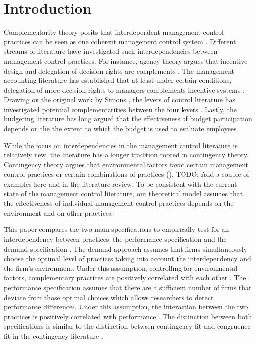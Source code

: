 \documentclass[12pt]{article}
\begin{document}
\section{Introduction}\label{introduction}

 Complementarity theory posits that interdependent management control practices can be seen as one coherent management control system \citep{Milgrom1995, Grabner2013}. Different streams of literature have investigated such interdependencies between management control practices. For instance, agency theory argues that incentive design and delegation of decision rights are complements \citep{Holmstrom1994}. The management accounting literature has established that at least under certain conditions, delegation of more decision rights to managers complements incentive systems \citep{Moers2006, Indjejikian2012, Bouwens2007}. Drawing on the original work by Simons \citetext{\citeyear{Simons1995}; \citeyear{Simons2000}}, the levers of control literature has investigated potential complementarities between the four levers \citep{Widener2007}. Lastly, the budgeting literature has long argued that the effectiveness of budget participation depends on the the extent to which the budget is used to evaluate employees \citep{Brownell1991, Dunk1993}.
 
While the focus on interdependencies in the management control literature is relatively new, the literature has a longer tradition rooted in contingency theory.  Contingency theory argues that environmental factors favor certain management control practices or certain combinations of practices (\citet{Grabner2013,Chenhall2003}). TODO: Add a couple of examples here and in the literature review. To be consistent with the current state of the management control literature, our theoretical model assumes that the effectiveness of individual management control practices depends on the environment and on other practices.
 
This paper compares the two main specifications to empirically test for an interdependency between practices: the performance specification and the demand specification \citep{Grabner2013}. The demand approach assumes that firms simultaneously choose the optimal level of practices taking into account the interdependency and the firm's environment. Under this assumption, controlling for environmental factors, complementary practices are positively correlated with each other \citep{Arora1996,Grabner2013,Johansson2018, Hofmann2015OrganizationalChoices}. The performance specification assumes that there are a sufficient number of firms that deviate from those optimal choices which allows researchers to detect performance differences. Under this assumption, the interaction between the two practices is positively correlated with performance \citep{Athey1998,Carree2011, Grabner2013, Hofmann2015OrganizationalChoices}. The distinction between both specifications is similar to the distinction between contingency fit and congruence fit in the contingency literature \citep{VandeVen1985a, Gerdin2004}. 
\end{document}
